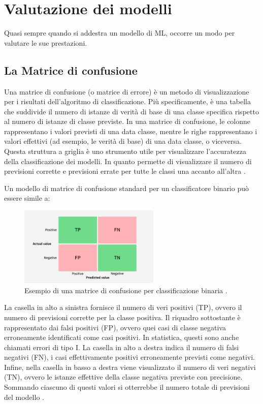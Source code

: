 \newpage
\section{Valutazione dei modelli}
Quasi sempre quando si addestra un modello di ML, occorre un modo per valutare le 
sue prestazioni.

\subsection{La Matrice di confusione}
Una matrice di confusione (o matrice di errore) è un metodo di visualizzazione 
per i risultati dell'algoritmo di classificazione. Più specificamente, 
è una tabella che suddivide il numero di istanze di verità di base di una 
classe specifica rispetto al numero di istanze di classe previste.
In una matrice di confusione, le colonne rappresentano i valori previsti di una 
data classe, mentre le righe rappresentano i valori effettivi 
(ad esempio, le verità di base) di una data classe, o viceversa.
Questa struttura a griglia è uno strumento utile per visualizzare l'accuratezza 
della classificazione dei modelli. In quanto permette di visualizzare 
il numero di previsioni corrette e previsioni errate per tutte le classi una 
accanto all'altra
\cite{Confusion_Matrix_e_metrics1,Confusion_Matrix_e_metrics2}.

Un modello di matrice di confusione standard per un classificatore 
binario può essere simile a:

\begin{figure}[H]
    \centering
    \includegraphics[width=0.60\textwidth]{Immagini/Grafici/esempio_MC_1.png}
    \caption{Esempio di una matrice di confusione per classificazione binaria
    \cite{Confusion_Matrix_e_metrics1} .}
\end{figure}

La casella in alto a sinistra fornisce il numero di veri positivi (TP), ovvero 
il numero di previsioni corrette per la classe positiva. Il riquadro sottostante è 
rappresentato dai falsi positivi (FP), ovvero quei casi di classe negativa erroneamente 
identificati come casi positivi. In statistica, questi sono anche chiamati errori 
di tipo I. La casella in alto a destra indica il numero di falsi negativi (FN), 
i casi effettivamente positivi erroneamente previsti come negativi. Infine, nella 
casella in basso a destra viene visualizzato il numero di veri negativi (TN), 
ovvero le istanze effettive della classe negativa previste con precisione. 
Sommando ciascuno di questi valori si otterrebbe il numero totale di previsioni 
del modello \cite{Confusion_Matrix_e_metrics1,Confusion_Matrix_e_metrics2}.

